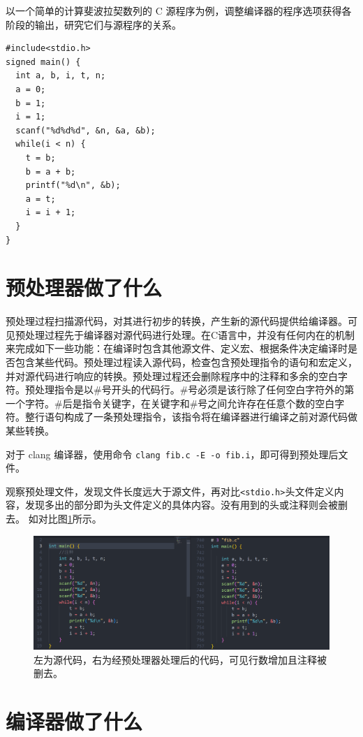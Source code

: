 \documentclass[UTF8,a4paper,10pt]{ctexart}
\begin{document}
以一个简单的计算斐波拉契数列的 C 源程序为例，调整编译器的程序选项获得各阶段的输出，研究它们与源程序的关系。

\begin{verbatim}
#include<stdio.h>
signed main() {
  int a, b, i, t, n;
  a = 0;
  b = 1;
  i = 1;
  scanf("%d%d%d", &n, &a, &b);
  while(i < n) {
    t = b;
    b = a + b;
    printf("%d\n", &b);
    a = t;
    i = i + 1;
  }
}
\end{verbatim}

\section{预处理器做了什么}
预处理过程扫描源代码，对其进行初步的转换，产生新的源代码提供给编译器。可见预处理过程先于编译器对源代码进行处理。在C语言中，并没有任何内在的机制来完成如下一些功能：在编译时包含其他源文件、定义宏、根据条件决定编译时是否包含某些代码。预处理过程读入源代码，检查包含预处理指令的语句和宏定义，并对源代码进行响应的转换。预处理过程还会删除程序中的注释和多余的空白字符。预处理指令是以\#号开头的代码行。\#号必须是该行除了任何空白字符外的第一个字符。\#后是指令关键字，在关键字和\#号之间允许存在任意个数的空白字符。整行语句构成了一条预处理指令，该指令将在编译器进行编译之前对源代码做某些转换。

对于 clang 编译器，使用命令 \verb|clang fib.c -E -o fib.i|，即可得到预处理后文件。

观察预处理文件，发现文件长度远大于源文件，再对比\verb|<stdio.h>|头文件定义内容，发现多出的部分即为头文件定义的具体内容。没有用到的头或注释则会被删去。 如对比图\ref{pic:1}所示。

\begin{figure}[H]
  \centering
  \includegraphics[width=\textwidth]{figure/diff1.png}
  \caption{左为源代码，右为经预处理器处理后的代码，可见行数增加且注释被删去。}
  \label{pic:1}
\end{figure}

\section{编译器做了什么}
\end{document}
